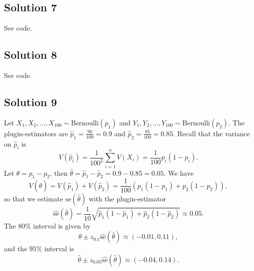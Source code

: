 \subsection*{Solution 7}

See code.


\subsection*{Solution 8}

See code.


\subsection*{Solution 9}

Let $X_1, X_2, ..., X_{100} \sim \mathrm{Bernoulli}(p_1)$ and $Y_1, Y_2, ..., Y_{100} \sim \mathrm{Bernoulli}(p_2)$.
The plugin-estimators are $\hat{p}_1 = \frac{90}{100} = 0.9$ and $\hat{p}_2 = \frac{85}{100} = 0.85$.
Recall that the variance on $\hat{p}_i$ is
\begin{equation*}
    V(\hat{p}_i) = \frac{1}{100^2} \sum_{i = 1}^n V(X_i)
        = \frac{1}{100} p_i(1 - p_i).
\end{equation*}
Let $\theta = p_1 - p_2$, then $\hat{\theta} = \hat{p}_1 - \hat{p}_2 = 0.9 - 0.85 = 0.05$.
We have
\begin{equation*}
    V(\hat{\theta})
        = V(\hat{p}_1) + V(\hat{p}_2)
        = \frac{1}{100}(p_1(1 - p_1) + p_2(1 - p_2)),
\end{equation*}
so that we estimate $\mathrm{se}(\hat{\theta})$ with the plugin-estimator
\begin{equation*}
    \hat{\mathrm{se}}(\hat{\theta})
        = \frac{1}{10} \sqrt{\hat{p}_1(1 - \hat{p}_1) + \hat{p}_2(1 - \hat{p}_2)}
        \approx 0.05.
\end{equation*}
The $80\%$ interval is given by
\begin{equation*}
    \hat{\theta} \pm z_{0.1} \hat{\mathrm{se}}(\hat{\theta})
        \approx (-0.01, 0.11),
\end{equation*}
and the $95\%$ interval is
\begin{equation*}
    \hat{\theta} \pm z_{0.05} \hat{\mathrm{se}}(\hat{\theta})
        \approx (-0.04, 0.14).
\end{equation*}
